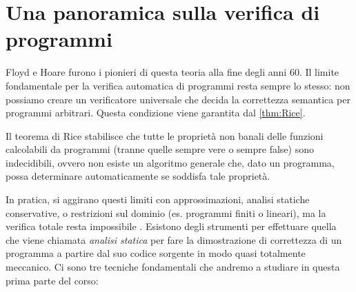 \section{Una panoramica sulla verifica di programmi}Floyd e Hoare furono i pionieri di questa teoria alla fine degli anni 60. Il limite fondamentale per la verifica automatica di programmi resta sempre lo stesso: non possiamo creare un verificatore universale che decida la correttezza semantica per programmi arbitrari\cite{rice-app}. Questa condizione viene garantita dal \cref{thm:Rice}.
\begin{theorem}[di Rice]
	Il teorema di Rice stabilisce che tutte le proprietà non banali delle funzioni calcolabili da programmi (tranne quelle sempre vere o sempre false) sono indecidibili, ovvero non esiste un algoritmo generale che, dato un programma, possa determinare automaticamente se soddisfa tale proprietà.\cite{rice}
	\label{thm:Rice}
\end{theorem}
In pratica, si aggirano questi limiti con approssimazioni, analisi statiche conservative, o restrizioni sul dominio (es. programmi finiti o lineari), ma la verifica totale resta impossibile \cite{rice-app}.
Esistono degli strumenti per effettuare quella che viene chiamata \textit{analisi statica} per fare la dimostrazione di correttezza di un programma a partire dal suo codice sorgente in modo quasi totalmente meccanico. Ci sono tre tecniche fondamentali che andremo a studiare in questa prima parte del corso:
